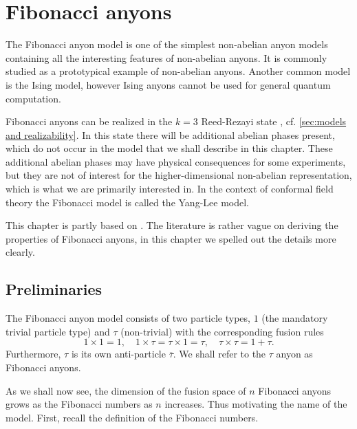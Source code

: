 
\chapter{Fibonacci anyons}\label{fibonacci anyons}

The Fibonacci anyon model is one of the simplest non-abelian anyon models containing all the interesting features of non-abelian anyons. It is commonly studied as a prototypical example of non-abelian anyons. Another common model is the Ising model, however Ising anyons cannot be used for general quantum computation.

Fibonacci anyons can be realized in the $k=3$ Reed-Rezayi state \cite{topological quantum compiling}, cf. \cref{sec:models and realizability}. In this state there will be additional abelian phases present, which do not occur in the model that we shall describe in this chapter. These additional abelian phases may have physical consequences for some experiments, but they are not of interest for the higher-dimensional non-abelian representation, which is what we are primarily interested in. In the context of conformal field theory the Fibonacci model is called the Yang-Lee model.

This chapter is partly based on \cite{preskill,topological quantum compiling,short intro fib}. The literature is rather vague on deriving the properties of Fibonacci anyons, in this chapter we spelled out the details more clearly.

\section{Preliminaries}\label{sec:fibonacci preliminaries}

The Fibonacci anyon model consists of two particle types, $1$ (the mandatory trivial particle type) and $τ$ (non-trivial) with the corresponding fusion rules
\begin{equation}
  1 \times 1 = 1, \quad
  1 \times τ = τ \times 1 = τ, \quad
  τ \times τ = 1 + τ.
\end{equation}
Furthermore, $\tau$ is its own anti-particle $\overline{τ}$. We shall refer to the $τ$ anyon as Fibonacci anyons.

As we shall now see, the dimension of the fusion space of $n$ Fibonacci anyons grows as the Fibonacci numbers as $n$ increases. Thus motivating the name of the model. First, recall the definition of the Fibonacci numbers.

